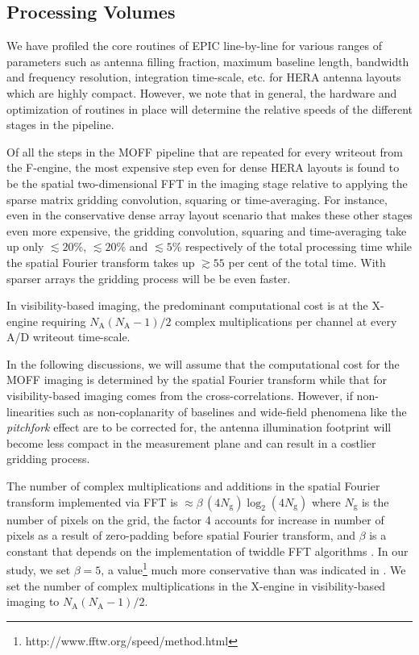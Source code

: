 \documentclass[a4paper,fleqn,usenatbib]{mnras}
\newcommand{\Nant}{N_\textrm{A}}
\newcommand{\Ngrid}{N_\textrm{g}}
\begin{document}
\subsection{Processing Volumes}

We have profiled the core routines of EPIC line-by-line for various ranges of parameters such as antenna filling fraction, maximum baseline length, bandwidth and frequency resolution, integration time-scale, etc. for HERA antenna layouts which are highly compact. However, we note that in general, the hardware and optimization of routines in place will determine the relative speeds of the different stages in the pipeline. 

Of all the steps in the MOFF pipeline that are repeated for every writeout from the F-engine, the most expensive step even for dense HERA layouts is found to be the spatial two-dimensional FFT in the imaging stage relative to applying the sparse matrix gridding convolution, squaring or time-averaging. For instance, even in the conservative dense array layout scenario that makes these other stages even more expensive, the gridding convolution, squaring and time-averaging take up only $\lesssim 20$\%, $\lesssim 20$\% and $\lesssim 5$\% respectively of the total processing time while the spatial Fourier transform takes up $\gtrsim 55$ per cent of the total time. With sparser arrays the gridding process will be be even faster. 

In visibility-based imaging, the predominant computational cost is at the X-engine requiring $\Nant(\Nant-1)/2$ complex multiplications per channel at every A/D writeout time-scale. 

In the following discussions, we will assume that the computational cost for the MOFF imaging is determined by the spatial Fourier transform while that for visibility-based imaging comes from the cross-correlations. However, if non-linearities such as non-coplanarity of baselines \citep{cor08} and wide-field phenomena like the {\it pitchfork} effect \citep{thy15a,thy15b} are to be corrected for, the antenna illumination footprint will become less compact in the measurement plane and can result in a costlier gridding process.

The number of complex multiplications and additions in the spatial Fourier transform implemented via FFT is $\approx \beta\,(4\Ngrid)\log_2(4\Ngrid)$ where $\Ngrid$ is the number of pixels on the grid, the factor 4 accounts for increase in number of pixels as a result of zero-padding before spatial Fourier transform, and $\beta$ is a constant that depends on the implementation of twiddle FFT algorithms \citep{bri74}. In our study, we set $\beta=5$, a value\footnote{http://www.fftw.org/speed/method.html} much more conservative than was indicated in \citet{mor11}. We set the number of complex multiplications in the X-engine in visibility-based imaging to $\Nant(\Nant-1)/2$.
\end{document}
